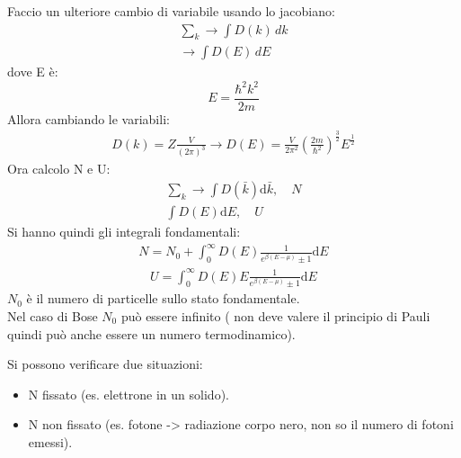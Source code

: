 Faccio un ulteriore cambio di variabile usando lo jacobiano:
\begin{equation}\begin{split} 
\sum_{k}\rightarrow \int D(k)\,dk \\
\rightarrow \int D(E)\,dE 
\end{split}\end{equation}
dove E è:
\begin{equation}
E=\dfrac{\hbar^{2}k^2}{2m}
\end{equation}
Allora cambiando le variabili:
\begin{equation}\begin{split}
D\left(k\right)=Z\frac{V}{\left(2\pi\right)^3} \rightarrow D\left(E\right)=\frac{V}{2\pi^2}\left(\frac{2m}{\hbar ^2}\right)^{\frac{3}{2}}E^{\frac{1}{2}}
\end{split}\end{equation}
Ora calcolo N e U:
\begin{equation}\begin{split}
\sum_k\longrightarrow \int{D\left(\bar k\right)\textrm{d}\bar k}, \quad N\\
\int{D\left(E\right)\textrm{d}E}, \quad U
\end{split}\end{equation}
Si hanno quindi gli integrali fondamentali:
\begin{equation}\begin{split}
N=N_0+\int_{0}^{\infty }{D\left(E\right)\frac{1}{e^{\beta\left(E-\mu\right)}\pm 1} \textrm{d}E}
\end{split}\end{equation}
\begin{equation}\begin{split}
U=\int_{0}^{\infty }{D\left(E\right)E\frac{1}{e^{\beta\left(E-\mu\right)}\pm 1} \textrm{d}E}
\end{split}\end{equation}
$N_0$ è il numero di particelle sullo stato fondamentale.\\ Nel caso di Bose $N_0$ può essere infinito ( non deve valere il principio di Pauli quindi può anche essere un numero termodinamico).

Si possono verificare due situazioni:
\begin{itemize}
\item N fissato  (es. elettrone in un solido).
\item N non fissato  (es. fotone -> radiazione corpo nero, non so il numero di fotoni emessi).
\end{itemize}

